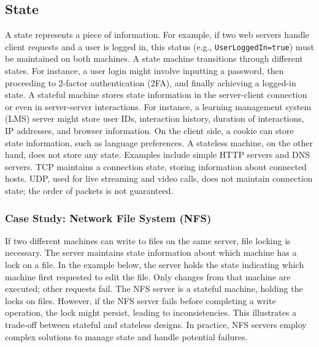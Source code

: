 \subsection{State}
A state represents a piece of information. For example, if two web servers handle client requests and a user is logged in, this status (e.g., \texttt{UserLoggedIn=true}) must be maintained on both machines. A state machine transitions through different states.  For instance, a user login might involve inputting a password, then proceeding to 2-factor authentication (2FA), and finally achieving a logged-in state.  A stateful machine stores state information in the server-client connection or even in server-server interactions.  For instance, a learning management system (LMS) server might store user IDs, interaction history, duration of interactions, IP addresses, and browser information. On the client side, a cookie can store state information, such as language preferences.  A stateless machine, on the other hand, does not store any state. Examples include simple HTTP servers and DNS servers.  TCP maintains a connection state, storing information about connected hosts. UDP, used for live streaming and video calls, does not maintain connection state; the order of packets is not guaranteed.

\subsubsection{Case Study: Network File System (NFS)}

If two different machines can write to files on the same server, file locking is necessary.  The server maintains state information about which machine has a lock on a file.  In the example below, the server holds the state indicating which machine first requested to edit the file. Only changes from that machine are executed; other requests fail. The NFS server is a stateful machine, holding the locks on files.  However, if the NFS server fails before completing a write operation, the lock might persist, leading to inconsistencies. This illustrates a trade-off between stateful and stateless designs. In practice, NFS servers employ complex solutions to manage state and handle potential failures.


